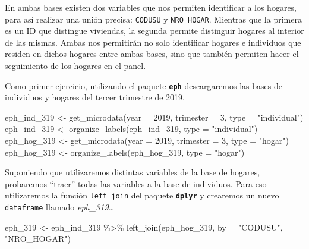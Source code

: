 \documentclass[
]{book}
\newenvironment{Shaded}{\begin{snugshade}}{\end{snugshade}}
\newcommand{\AttributeTok}[1]{\textcolor[rgb]{0.77,0.63,0.00}{#1}}
\newcommand{\DecValTok}[1]{\textcolor[rgb]{0.00,0.00,0.81}{#1}}
\newcommand{\FunctionTok}[1]{\textcolor[rgb]{0.00,0.00,0.00}{#1}}
\newcommand{\NormalTok}[1]{#1}
\newcommand{\OtherTok}[1]{\textcolor[rgb]{0.56,0.35,0.01}{#1}}
\newcommand{\SpecialCharTok}[1]{\textcolor[rgb]{0.00,0.00,0.00}{#1}}
\newcommand{\StringTok}[1]{\textcolor[rgb]{0.31,0.60,0.02}{#1}}
\begin{document}
En ambas bases existen dos variables que nos permiten identificar a los hogares, para así realizar una unión precisa: \texttt{CODUSU} y \texttt{NRO\_HOGAR}. Mientras que la primera es un ID que distingue viviendas, la segunda permite distinguir hogares al interior de las mismas. Ambas nos permitirán no solo identificar hogares e individuos que residen en dichos hogares entre ambas bases, sino que también permiten hacer el seguimiento de los hogares en el panel.

Como primer ejercicio, utilizando el paquete \textbf{\texttt{eph}} descargaremos las bases de individuos y hogares del tercer trimestre de 2019.

\begin{Shaded}
\begin{Highlighting}[]
\NormalTok{eph\_ind\_319 }\OtherTok{\textless{}{-}} \FunctionTok{get\_microdata}\NormalTok{(}\AttributeTok{year =} \DecValTok{2019}\NormalTok{, }\AttributeTok{trimester =} \DecValTok{3}\NormalTok{, }\AttributeTok{type =} \StringTok{"individual"}\NormalTok{)}
\NormalTok{eph\_ind\_319 }\OtherTok{\textless{}{-}} \FunctionTok{organize\_labels}\NormalTok{(eph\_ind\_319, }\AttributeTok{type =} \StringTok{"individual"}\NormalTok{)}
\NormalTok{eph\_hog\_319 }\OtherTok{\textless{}{-}} \FunctionTok{get\_microdata}\NormalTok{(}\AttributeTok{year =} \DecValTok{2019}\NormalTok{, }\AttributeTok{trimester =} \DecValTok{3}\NormalTok{, }\AttributeTok{type =} \StringTok{"hogar"}\NormalTok{)}
\NormalTok{eph\_hog\_319 }\OtherTok{\textless{}{-}} \FunctionTok{organize\_labels}\NormalTok{(eph\_hog\_319, }\AttributeTok{type =} \StringTok{"hogar"}\NormalTok{)}
\end{Highlighting}
\end{Shaded}

Suponiendo que utilizaremos distintas variables de la base de hogares, probaremos ``traer'' todas las variables a la base de individuos. Para eso utilizaremos la función \texttt{left\_join} del paquete \textbf{\texttt{dplyr}} y crearemos un nuevo \texttt{dataframe} llamado \emph{eph\_319}\ldots{}

\begin{Shaded}
\begin{Highlighting}[]
\NormalTok{eph\_319 }\OtherTok{\textless{}{-}}\NormalTok{ eph\_ind\_319 }\SpecialCharTok{\%\textgreater{}\%} 
    \FunctionTok{left\_join}\NormalTok{(eph\_hog\_319, }\AttributeTok{by =} \StringTok{"CODUSU"}\NormalTok{, }\StringTok{"NRO\_HOGAR"}\NormalTok{)}
\end{Highlighting}
\end{Shaded}
\end{document}

